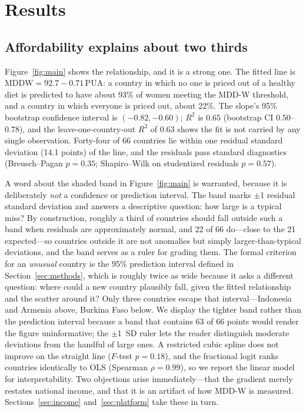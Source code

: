 \documentclass[11pt]{article}
\begin{document}
\section{Results}\label{sec:results}

\subsection{Affordability explains about two thirds}\label{sec:headline}

Figure~\ref{fig:main} shows the relationship, and it is a strong one. The fitted line is $\mathrm{MDDW} = 92.7 - 0.71\,\mathrm{PUA}$: a country in which no one is priced out of a healthy diet is predicted to have about 93\% of women meeting the MDD-W threshold, and a country in which everyone is priced out, about 22\%. The slope's 95\% bootstrap confidence interval is $(-0.82, -0.60)$; $R^2$ is $0.65$ (bootstrap CI $0.50$--$0.78$), and the leave-one-country-out $R^2$ of $0.63$ shows the fit is not carried by any single observation. Forty-four of 66 countries lie within one residual standard deviation (14.1 points) of the line, and the residuals pass standard diagnostics (Breusch--Pagan $p=0.35$; Shapiro--Wilk on studentized residuals $p=0.57$).

A word about the shaded band in Figure~\ref{fig:main} is warranted, because it is deliberately \emph{not} a confidence or prediction interval. The band marks $\pm$1 residual standard deviation and answers a descriptive question: how large is a typical miss? By construction, roughly a third of countries should fall outside such a band when residuals are approximately normal, and 22 of 66 do---close to the 21 expected---so countries outside it are not anomalies but simply larger-than-typical deviations, and the band serves as a ruler for grading them. The formal criterion for an \emph{unusual} country is the 95\% prediction interval defined in Section~\ref{sec:methods}, which is roughly twice as wide because it asks a different question: where could a new country plausibly fall, given the fitted relationship and the scatter around it? Only three countries escape that interval---Indonesia and Armenia above, Burkina Faso below. We display the tighter band rather than the prediction interval because a band that contains 63 of 66 points would render the figure uninformative; the $\pm$1~SD ruler lets the reader distinguish moderate deviations from the handful of large ones. A restricted cubic spline does not improve on the straight line ($F$-test $p=0.18$), and the fractional logit ranks countries identically to OLS (Spearman $\rho=0.99$), so we report the linear model for interpretability. Two objections arise immediately---that the gradient merely restates national income, and that it is an artifact of how MDD-W is measured. Sections~\ref{sec:income} and~\ref{sec:platform} take these in turn.
\end{document}

